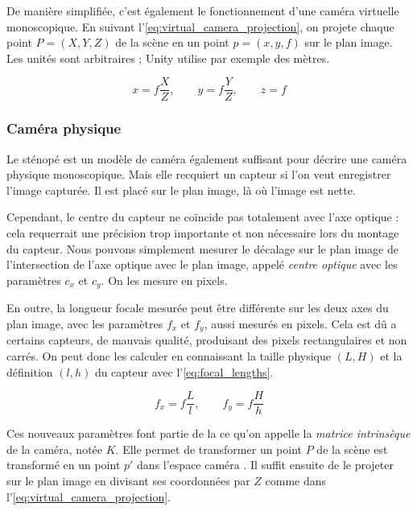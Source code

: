 
De manière simplifiée, c'est également le fonctionnement d'une caméra virtuelle monoscopique. En suivant l'\autoref{eq:virtual_camera_projection}, on projete chaque point $P=(X,Y,Z)$ de la scène en un point $p=(x,y,f)$ sur le plan image. Les unités sont arbitraires ; Unity utilise par exemple des mètres.

\begin{equation}
  \label{eq:virtual_camera_projection}
  x = f \frac{X}{Z},\qquad y = f \frac{Y}{Z},\qquad z = f
\end{equation}

\subsubsection{Caméra physique}
Le sténopé est un modèle de caméra également suffisant pour décrire une caméra physique monoscopique. Mais elle recquiert un capteur si l'on veut enregistrer l'image capturée. Il est placé sur le plan image, là où l'image est nette.

Cependant, le centre du capteur ne coïncide pas totalement avec l'axe optique : cela requerrait une précision trop importante et non nécessaire lors du montage du capteur. Nous pouvons simplement mesurer le décalage sur le plan image de l'intersection de l'axe optique avec le plan image, appelé \emph{centre optique} avec les paramètres $c_x$ et $c_y$. On les mesure en pixels.

En outre, la longueur focale mesurée peut être différente sur les deux axes du plan image, avec les paramètres $f_x$ et $f_y$, aussi mesurés en pixels. Cela est dû a certains capteurs, de mauvais qualité, produisant des pixels rectangulaires et non carrés. On peut donc les calculer en connaissant la taille physique $(L,H)$ et la définition $(l,h)$ du capteur avec l'\autoref{eq:focal_lengths}.

\begin{equation}
  \label{eq:focal_lengths}
  f_x = f \frac{L}{l},\qquad f_y = f \frac{H}{h}
\end{equation}

Ces nouveaux paramètres font partie de la ce qu'on appelle la \emph{matrice intrinsèque} de la caméra, notée $K$. Elle permet de transformer un point $P$ de la scène est transformé en un point $p'$ dans l'espace caméra . Il suffit ensuite de le projeter sur le plan image en divisant ses coordonnées par $Z$ comme dans l'\autoref{eq:virtual_camera_projection}.

